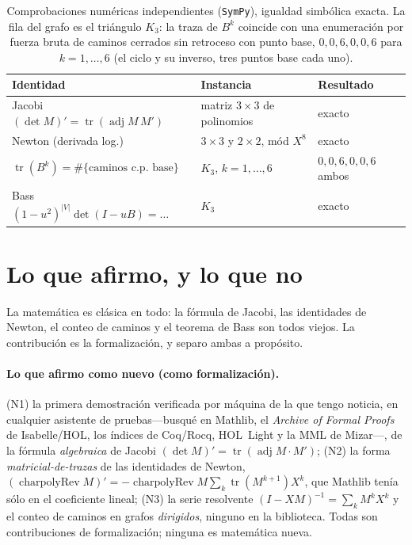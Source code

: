 \documentclass[11pt]{article}
\newcommand{\tr}{\operatorname{tr}}
\newcommand{\adj}{\operatorname{adj}}
\DeclareMathOperator{\charpolyRev}{charpolyRev}
\begin{document}
\begin{table}[h]
\centering\footnotesize
\caption{Comprobaciones num\'ericas independientes (\texttt{SymPy}), igualdad simb\'olica exacta. La
fila del grafo es el tri\'angulo $K_3$: la traza de $B^k$ coincide con una enumeraci\'on por fuerza
bruta de caminos cerrados sin retroceso con punto base, $0,0,6,0,0,6$ para $k=1,\dots,6$ (el ciclo y
su inverso, tres puntos base cada uno).}
\label{tab:checks}
\begin{tabular}{@{}lll@{}}
\toprule
\rowcolor{ggteal}
{\color{white}\textbf{Identidad}} & {\color{white}\textbf{Instancia}} & {\color{white}\textbf{Resultado}}\\
\midrule
Jacobi $(\det M)'=\tr(\adj M\,M')$ & matriz $3\times3$ de polinomios & exacto\\
Newton (derivada log.) & $3\times3$ y $2\times2$, m\'od $X^8$ & exacto\\
$\tr(B^k)=\#\{\text{caminos c.p.\ base}\}$ & $K_3$, $k=1,\dots,6$ & $0,0,6,0,0,6$ ambos\\
Bass $(1{-}u^2)^{|V|}\det(I{-}uB)=\dots$ & $K_3$ & exacto\\
\bottomrule
\end{tabular}
\end{table}

\section{Lo que afirmo, y lo que no}
\label{sec:limits}

La matem\'atica es cl\'asica en todo: la f\'ormula de Jacobi, las identidades de Newton, el conteo de
caminos y el teorema de Bass son todos viejos. La contribuci\'on es la formalizaci\'on, y separo
ambas a prop\'osito.

\paragraph{Lo que afirmo como nuevo (como formalizaci\'on).}
(N1) la primera demostraci\'on verificada por m\'aquina de la que tengo noticia, en cualquier
asistente de pruebas---busqu\'e en Mathlib, el \emph{Archive of Formal Proofs} de Isabelle/HOL, los
\'indices de Coq/Rocq, HOL~Light y la MML de Mizar---, de la f\'ormula \emph{algebraica} de Jacobi
$(\det M)'=\tr(\adj M\cdot M')$; (N2)
la forma \emph{matricial-de-trazas} de las identidades de Newton,
$(\charpolyRev M)'=-\charpolyRev M\sum_k\tr(M^{k+1})X^k$, que Mathlib ten\'ia s\'olo en el coeficiente
lineal; (N3) la serie resolvente $(I-XM)^{-1}=\sum_k M^kX^k$ y el conteo de caminos en grafos
\emph{dirigidos}, ninguno en la biblioteca. Todas son contribuciones de formalizaci\'on; ninguna es
matem\'atica nueva.
\end{document}
